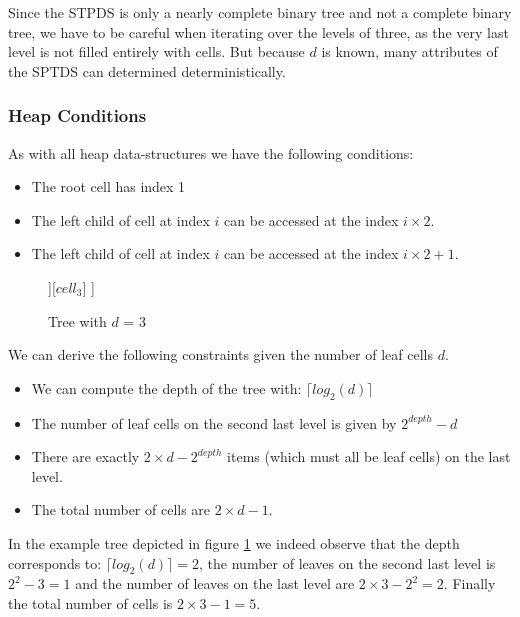 \documentclass[]{article}
\begin{document}
Since the STPDS is only a nearly complete binary tree and not a complete binary tree, we have to be careful when iterating over the levels of three, as the very last level is not filled entirely with cells. But because $d$ is known, many attributes of the SPTDS can determined deterministically.

\subsubsection{Heap Conditions}
As with all heap data-structures we have the following conditions:

\begin{itemize}
	\item The root cell has index 1
	\item The left child of cell at index $i$ can be accessed at the index $i\times2$. 
	\item The left child of cell at index $i$ can be accessed at the index $i\times2 + 1$. 
\end{itemize}

\begin{figure}[H]
	\centering
	\begin{forest}
		[$cell_1$
		[$cell_2$ [$cell_4$] [$cell_5$]][$cell_3$]  
		]
	\end{forest}
	\caption{Tree with $d$ = 3}
	\label{fig:extree}
\end{figure}

\vspace{0.5cm}
We can derive the following constraints given the number of leaf cells $d$. 

\begin{itemize}
	\item We can compute the depth of the tree with: $\lceil log_2(d) \rceil$
	\item The number of leaf cells on the second last level is given by $2^{depth} - d$ 
	\item There are exactly $2 \times d - 2^{depth}$ items (which must all be leaf cells) on the last level. 
	\item The total number of cells are $2\times d - 1$.
\end{itemize}

In the example tree depicted in figure \ref{fig:extree} we indeed observe that the depth corresponds to: $\lceil log_2(d) \rceil = 2$, the number of leaves on the second last level is  $2^{2} - 3 = 1$ and the number of leaves on the last level are $2 \times 3 - 2^{2} = 2$. Finally the total number of cells is $2\times 3 - 1 = 5$.
\end{document}
